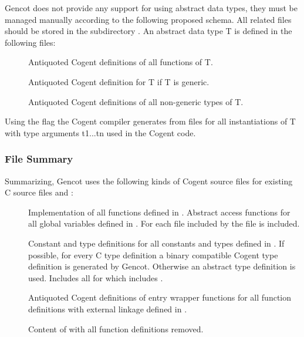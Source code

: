 Gencot does not provide any support for using abstract data types, they must be managed manually according to the following
proposed schema. All related files should be stored in the subdirectory .
An abstract data type T is defined in the following files:
\begin{description}
\item[] Antiquoted Cogent definitions of all functions of T. 
\item[] Antiquoted Cogent definition for T if T is generic.
\item[] Antiquoted Cogent definitions of all non-generic types of T.
\end{description}
Using the flag  the Cogent compiler generates from  files  for all 
instantiations of T with type arguments t1...tn used in the Cogent code.

\subsubsection{File Summary}

Summarizing, Gencot uses the following kinds of Cogent source files for existing C source files  and :
\begin{description}
\item[] Implementation of all functions defined in . Abstract access functions for all global
variables defined in . For each file  included by
   the file  is included.

\item[] Constant and type definitions for all constants and types defined in . 
  If possible, for every C type definition a binary compatible Cogent type 
  definition is generated by Gencot. Otherwise an abstract type definition is used. Includes
  all  for which  includes .
\item[] Antiquoted Cogent definitions of entry wrapper functions for all function definitions with external linkage
  defined in .
\item[] Content of  with all function definitions removed.
\end{description}

